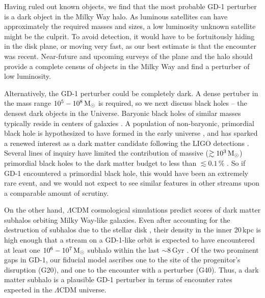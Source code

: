 \documentclass[twocolumn]{aastex62}
\begin{document}
Having ruled out known objects, we find that the most probable GD-1 perturber is a dark object in the Milky Way halo.
As luminous satellites can have approximately the required masses and sizes, a low luminosity unknown satellite might be the culprit.
To avoid detection, it would have to be fortuitously hiding in the disk plane, or moving very fast, as our best estimate is that the encounter was recent.
Near-future and upcoming surveys of the plane \citep{schlafly2018} and the halo \citep{lsst} should provide a complete census of objects in the Milky Way and find a perturber of low luminosity.

Alternatively, the GD-1 perturber could be completely dark.
A dense pertuber in the mass range $10^5-10^8\,\rm M_\odot$ is required, so we next discuss black holes -- the densest dark objects in the Universe.
Baryonic black holes of similar masses typically reside in centers of galaxies \citep[the mass of Milky Way's supermassive black hole, Sgr A$^\star$, is $\approx4\times10^6\,\rm M_\odot$][]{boehle2016}.
A population of non-baryonic, primordial black hole is hypothesized to have formed in the early universe \citep{carr1974}, and has sparked a renewed interest as a dark matter candidate following the LIGO detections \citep{bird2016}.
Several lines of inquiry have limited the contribution of massive ($\gtrsim10^3\,\rm M_\odot$) primordial black holes to the dark matter budget to less than $\lesssim0.1\,\%$ \citep[and references within]{carr2016}.
So if GD-1 encountered a primordial black hole, this would have been an extremely rare event, and we would not expect to see similar features in other streams upon a comparable amount of scrutiny.

On the other hand, $\Lambda$CDM cosmological simulations predict scores of dark matter subhalos orbiting Milky Way-like galaxies.
Even after accounting for the destruction of subhalos due to the stellar disk \citep{donghia2010,gk2017}, their density in the inner 20\,kpc is high enough that a stream on a GD-1-like orbit is expected to have encountered at least one $10^6-10^7\rm\, M_\odot$ subhalo within the last $\sim8$\,Gyr \citep{erkal2016}.
Of the two prominent gaps in GD-1, our fiducial model ascribes one to the site of the progenitor's disruption (G20), and one to the encounter with a perturber (G40).
Thus, a dark matter subhalo is a plausible GD-1 perturber in terms of encounter rates expected in the $\Lambda$CDM universe.
\end{document}
